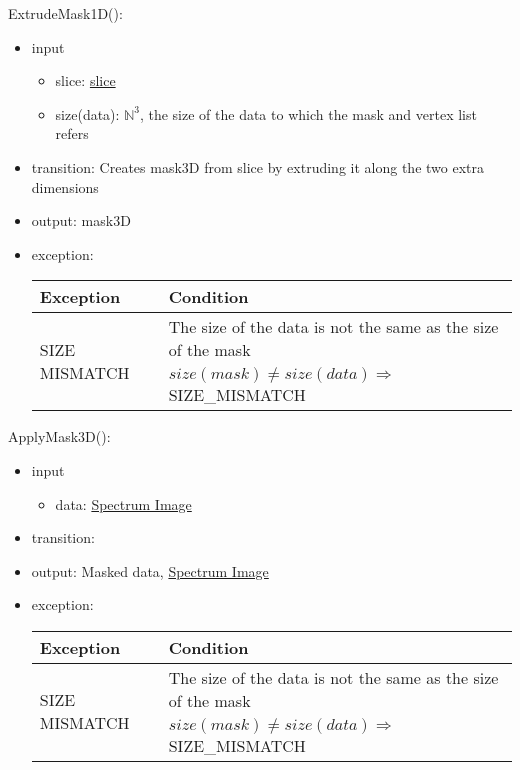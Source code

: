 \documentclass[12pt, titlepage]{article}
\begin{document}
\noindent ExtrudeMask1D():
\begin{itemize}
    \item input
    \begin{itemize}
        \item slice: \hyperref[Mod:Slice1D]{slice}
        \item size(data): $\mathbb{N}^3$, the size of the data to which the mask and vertex list refers
    \end{itemize}
    \item transition: Creates mask3D from slice by extruding it along the two extra dimensions
    \item output: mask3D
    \item exception:
    \begin{center}
        \begin{tabular}{p{3.5cm} p{12cm}}
            \toprule[0.15em]
            \textbf{Exception} & \textbf{Condition}\\
            \midrule[0.1em]
            \multirow{2}{0.25\textwidth}{SIZE MISMATCH} & The size of the data is not the same as the size of the mask\\ 
            & $size(mask) \neq size(data) \Rightarrow$ SIZE\_MISMATCH\\ 
            \bottomrule[0.15em]
        \end{tabular}
    \end{center}
\end{itemize}

\noindent ApplyMask3D():
\begin{itemize}
    \item input
    \begin{itemize}
        \item data: \hyperref[Mod:SI]{Spectrum Image}
    \end{itemize}
    \item transition: 
    \item output: Masked data, \hyperref[Mod:SI]{Spectrum Image}
    \item exception:
    \begin{center}
        \begin{tabular}{p{3.5cm} p{12cm}}
            \toprule[0.15em]
            \textbf{Exception} & \textbf{Condition}\\
            \midrule[0.1em]
            \multirow{2}{0.25\textwidth}{SIZE MISMATCH} & The size of the data is not the same as the size of the mask\\ 
            & $size(mask) \neq size(data) \Rightarrow$ SIZE\_MISMATCH\\ 
            \bottomrule[0.15em]
        \end{tabular}
    \end{center}
\end{itemize}
\end{document}
